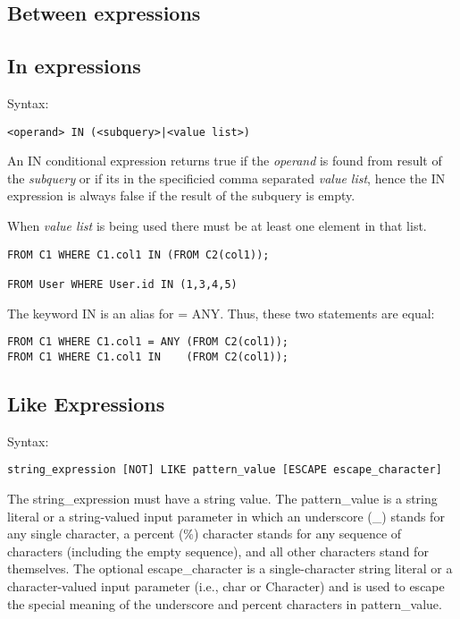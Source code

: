 \documentclass[11pt,a4paper]{report}
\begin{document}
\subsection{Between expressions}
\subsection{In expressions}
Syntax:

\begin{verbatim}
<operand> IN (<subquery>|<value list>)
\end{verbatim}

An IN conditional expression returns true if the \textsl{operand} is found from result of the \textsl{subquery} or if its in the specificied comma separated \textsl{value list}, hence the IN expression is always false if the result of the subquery is empty.

When \textsl{value list} is being used there must be at least one element in that list.

\begin{verbatim}
FROM C1 WHERE C1.col1 IN (FROM C2(col1));

FROM User WHERE User.id IN (1,3,4,5)
\end{verbatim}

The keyword IN is an alias for = ANY. Thus, these two statements are equal:

\begin{verbatim}
FROM C1 WHERE C1.col1 = ANY (FROM C2(col1));
FROM C1 WHERE C1.col1 IN    (FROM C2(col1));
\end{verbatim}

\subsection{Like Expressions}
Syntax:

\begin{verbatim}
string_expression [NOT] LIKE pattern_value [ESCAPE escape_character]
\end{verbatim}

The string\_expression must have a string value. The pattern\_value is a string literal or a string-valued input parameter in which an underscore (\_) stands for any single character, a percent (\%) character stands for any sequence of characters (including the empty sequence), and all other characters stand for themselves. The optional escape\_character is a single-character string literal or a character-valued input parameter (i.e., char or Character) and is used to escape the special meaning of the underscore and percent characters in pattern\_value.
\end{document}
